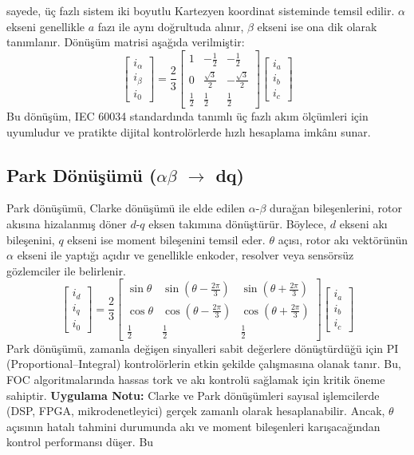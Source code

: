 sayede, üç fazlı sistem iki boyutlu Kartezyen koordinat sisteminde temsil edilir. $\alpha$ ekseni genellikle $a$ fazı ile aynı doğrultuda alınır, $\beta$ ekseni ise ona dik olarak tanımlanır. Dönüşüm matrisi aşağıda verilmiştir: \begin{equation} \begin{bmatrix} i_\alpha \\ i_\beta \\ i_0 \end{bmatrix} = \frac{2}{3} \begin{bmatrix} 1 & -\frac{1}{2} & -\frac{1}{2} \\ 0 & \frac{\sqrt{3}}{2} & -\frac{\sqrt{3}}{2} \\ \frac12 & \frac12 & \frac12 \end{bmatrix} \begin{bmatrix} i_a \\ i_b \\ i_c \end{bmatrix} \end{equation} Bu dönüşüm, IEC 60034 standardında tanımlı üç fazlı akım ölçümleri için uyumludur ve pratikte dijital kontrolörlerde hızlı hesaplama imkânı sunar. \subsection{Park Dönüşümü ($\alpha\beta$ $\rightarrow$ dq)} Park dönüşümü, Clarke dönüşümü ile elde edilen $\alpha$-$\beta$ durağan bileşenlerini, rotor akısına hizalanmış döner $d$-$q$ eksen takımına dönüştürür. Böylece, $d$ ekseni akı bileşenini, $q$ ekseni ise moment bileşenini temsil eder. $\theta$ açısı, rotor akı vektörünün $\alpha$ ekseni ile yaptığı açıdır ve genellikle enkoder, resolver veya sensörsüz gözlemciler ile belirlenir. \begin{equation} \begin{bmatrix} i_d \\ i_q \\ i_0 \end{bmatrix} = \frac{2}{3} \begin{bmatrix} \sin\theta & \sin\left(\theta-\frac{2\pi}{3}\right) & \sin\left(\theta+\frac{2\pi}{3}\right) \\ \cos\theta & \cos\left(\theta-\frac{2\pi}{3}\right) & \cos\left(\theta+\frac{2\pi}{3}\right) \\ \frac12 & \frac12 & \frac12 \end{bmatrix} \begin{bmatrix} i_a \\ i_b \\ i_c \end{bmatrix} \end{equation} Park dönüşümü, zamanla değişen sinyalleri sabit değerlere dönüştürdüğü için PI (Proportional–Integral) kontrolörlerin etkin şekilde çalışmasına olanak tanır. Bu, FOC algoritmalarında hassas tork ve akı kontrolü sağlamak için kritik öneme sahiptir. \textbf{Uygulama Notu:} Clarke ve Park dönüşümleri sayısal işlemcilerde (DSP, FPGA, mikrodenetleyici) gerçek zamanlı olarak hesaplanabilir. Ancak, $\theta$ açısının hatalı tahmini durumunda akı ve moment bileşenleri karışacağından kontrol performansı düşer. Bu 